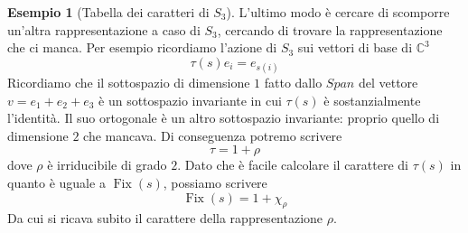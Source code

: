 \documentclass[11pt]{article}
\theoremstyle{plain}
\theoremstyle{definition}
\newtheorem{exmp}{Esempio}[section]
\theoremstyle{remark}
\newcommand{\C}{\mathbb{C}}
\DeclareMathOperator{\Fix}{Fix}
\begin{document}
\begin{exmp}[Tabella dei caratteri di $S_3$]
L'ultimo modo è cercare di scomporre un'altra rappresentazione a caso di $S_3$, cercando di trovare la rappresentazione che ci manca. Per esempio ricordiamo l'azione di $S_3$ sui vettori di base di $\C^3$
\[ \tau(s) e_i = e_{s(i)}\]
Ricordiamo che il sottospazio di dimensione $1$ fatto dallo $Span$ del vettore $v = e_1 + e_2 + e_3$ è un sottospazio invariante in cui $\tau(s)$ è sostanzialmente l'identità. Il suo ortogonale è un altro sottospazio invariante: proprio quello di dimensione $2$ che mancava. Di conseguenza potremo scrivere
\[ \tau = 1 + \rho\]
dove $\rho$ è irriducibile di grado $2$.
Dato che è facile calcolare il carattere di $\tau(s)$ in quanto è uguale a $\Fix(s)$, possiamo scrivere
\[ \Fix(s) = 1 + \chi_\rho\]
Da cui si ricava subito il carattere della rappresentazione $\rho$.
\end{exmp}
\end{document}
